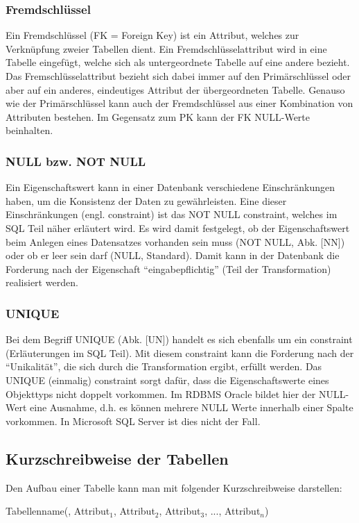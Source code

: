         \subsubsection{Fremdschlüssel}
          Ein Fremdschlüssel (FK = Foreign Key) ist ein Attribut, welches zur Verknüpfung zweier Tabellen dient. Ein Fremdschlüsselattribut wird in eine Tabelle eingefügt, welche sich als untergeordnete Tabelle auf eine andere bezieht. Das Fremschlüsselattribut bezieht sich dabei immer auf den Primärschlüssel oder aber auf ein anderes, eindeutiges Attribut der übergeordneten Tabelle. Genauso wie der Primärschlüssel kann auch der Fremdschlüssel aus einer Kombination von Attributen bestehen. Im Gegensatz zum PK kann der FK NULL-Werte beinhalten.
        \subsubsection{NULL bzw. NOT NULL}
          Ein Eigenschaftswert kann in einer Datenbank verschiedene Einschränkungen haben, um die Konsistenz der Daten zu gewährleisten. Eine dieser Einschränkungen (engl. constraint) ist das NOT NULL constraint, welches im SQL Teil näher erläutert wird. Es wird damit festgelegt, ob der Eigenschaftswert beim Anlegen eines Datensatzes vorhanden sein muss (NOT NULL, Abk. [NN]) oder ob er leer sein darf (NULL, Standard). Damit kann in der Datenbank die Forderung nach der Eigenschaft \enquote{eingabepflichtig} (Teil der Transformation) realisiert werden.
        \subsubsection{UNIQUE}
          Bei dem Begriff UNIQUE (Abk. [UN]) handelt es sich ebenfalls um ein constraint (Er\-läu\-terung\-en im SQL Teil). Mit diesem constraint kann die Forderung nach der \enquote{Unikalität}, die sich durch die Transformation ergibt, erfüllt werden. Das UNIQUE (einmalig) constraint sorgt dafür, dass die Eigenschaftswerte eines Objekttyps nicht doppelt vorkommen. Im RDBMS Oracle bildet hier der NULL-Wert eine Ausnahme, d.h. es können mehrere NULL Werte innerhalb einer Spalte vorkommen. In Microsoft SQL Server ist dies nicht der Fall.
      \subsection{Kurzschreibweise der Tabellen}
        Den Aufbau einer Tabelle kann man mit folgender Kurzschreibweise darstellen:

        \centerline{Tabellenname(, Attribut$_1$, Attribut$_2$, Attribut$_3$, ..., Attribut$_n$)}

